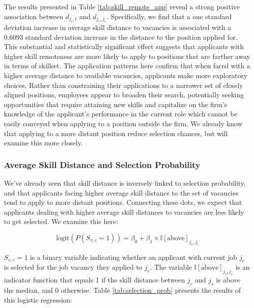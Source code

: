 The results presented in Table \ref{tab:skill_remote_app} reveal a strong positive association 
between $\overline{d}_{j_c, t}$ and $d_{j_v, j_c}$. Specifically, we find that a one standard deviation 
increase in average skill distance to vacancies is associated with a 0.6093 standard deviation increase 
in the distance to the position applied for. This substantial and statistically significant effect suggests 
that applicants with higher skill remoteness are more likely to apply to positions that are farther away in 
terms of skillset. The application patterns here confirm that when faced with a higher average distance to 
available vacancies, applicants make more exploratory choices. Rather than constraining their applications 
to a narrower set of closely aligned positions, employees appear to broaden their search, potentially seeking 
opportunities that require attaining new skills and capitalize on the firm's knowledge of the applicant's 
performance in the current role which cannot be easily conveyed when applying to a position outside the firm. 
We already know that applying to a more distant position reduce selection chances, but will examine this more closely. 




\subsubsection{Average Skill Distance and Selection Probability}

We've already seen that skill distance is inversely linked to selection probability, and that applicants facing 
higher average skill distance to the set of vacancies tend to apply to more distant positions. Connecting these 
dots, we expect that applicants dealing with higher average skill distances to vacancies are less likely to get 
selected. We examine this here:


\begin{equation}
\text{logit}(P(S_{v,c} = 1)) = \beta_0 + \beta_1 \times \mathbb{I}[\text{above}]_{j_v,j_c}
\end{equation} 

$S_{v,c} = 1$ is a binary variable indicating whether an applicant with current job $j_c$ is selected for the 
job vacancy they applied to $j_v$. The variable $\mathbb{I}[\text{above}]_{j_v,j_c}$ is an indicator function 
that equals 1 if the skill distance between $j_c$ and $j_s$ is above the median, and 0 otherwise. 
Table \ref{tab:selection_prob} presents the results of this logistic regression:

